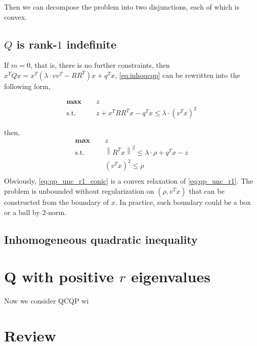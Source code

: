 \documentclass[a4paper, 10pt]{article}
\newcommand{\mx}{\mathbf{\max}\;}
\newcommand{\st}{\mathrm{s.t.\;}}
\begin{document}
Then we can decompose the problem into two disjunctions, each of which is convex.
\subsection{\(Q\) is rank-\(1\) indefinite}

If \(m = 0\), that is, there is no further constraints, then \(x^TQx = x^T(\lambda\cdot vv^T-RR^T)x + q^Tx\), \eqref{eq:inhoqcqp} can be rewritten into the following form,

\begin{equation}\label{eq:qp_unc_r1}
    \begin{aligned}
        \mx \quad & z                                              \\
        \st \quad & z + x^TRR^Tx - q^Tx \le \lambda \cdot (v^Tx)^2
    \end{aligned}
\end{equation}

then,
\begin{equation}\label{eq:qp_unc_r1_conic}
    \begin{aligned}
        \mx \quad & z                                                         \\
        \st \quad & \left\|R^Tx \right \|^2 \le \lambda \cdot \rho + q^Tx - z \\
                  & (v^Tx)^2 \le \rho                                         \\
    \end{aligned}
\end{equation}
Obviously, \eqref{eq:qp_unc_r1_conic} is a convex relaxation of \eqref{eq:qp_unc_r1}. The problem is unbounded without regularization on \((\rho, v^Tx)\) that can be constructed from the boundary of \(x\). In practice, such boundary could be a box or a ball by \(2\)-norm.

\subsection{Inhomogeneous quadratic inequality}
\section{Q with positive \(r\) eigenvalues}
Now we consider QCQP wi
\section{Review}
\end{document}
